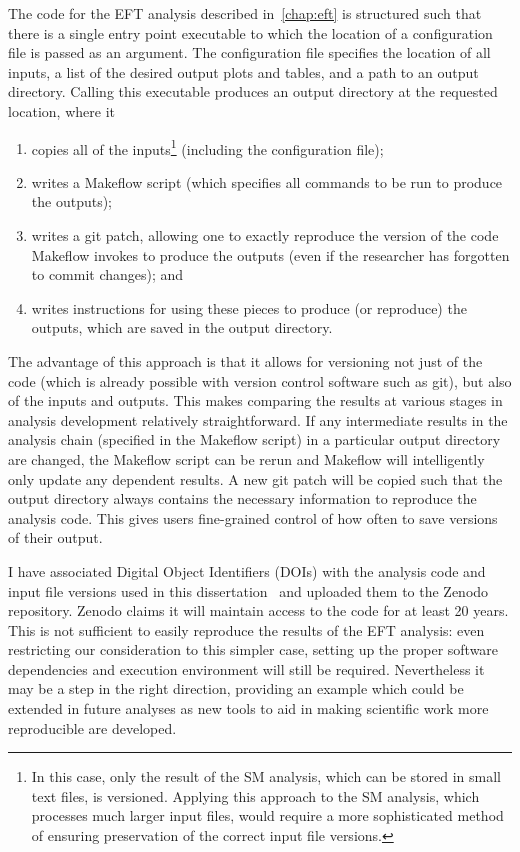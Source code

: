 The code for the EFT analysis described in~\cref{chap:eft} is structured such
that there is a single entry point executable to which the location of a
configuration file is passed as an argument. The configuration file specifies
the location of all inputs, a list of the desired output plots and tables, and a
path to an output directory. Calling this executable produces an output
directory at the requested location, where it
\begin{enumerate}
  \item copies all of the inputs\footnote{In this case, only the result of the SM analysis, which can be stored in small text files, is versioned. Applying this approach to the SM analysis, which processes much larger input files, would require a more sophisticated method of ensuring preservation of the correct input file versions.} (including the configuration file);
  \item writes a Makeflow script (which specifies all commands to be run to produce the outputs);
  \item writes a git patch, allowing one to exactly reproduce the version of the code Makeflow invokes to produce the outputs (even if the researcher has forgotten to commit changes); and
  \item writes instructions for using these pieces to produce (or reproduce) the outputs, which are saved in the output directory.
\end{enumerate}

The advantage of this approach is that it allows for versioning not just of the
code (which is already possible with version control software such as git), but
also of the inputs and outputs. This makes comparing the results at various
stages in analysis development relatively straightforward. If any intermediate
results in the analysis chain (specified in the Makeflow script) in a particular
output directory are changed, the Makeflow script can be rerun and Makeflow will
intelligently only update any dependent results. A new git patch will be copied
such that the output directory always contains the necessary information to
reproduce the analysis code. This gives users fine-grained control of how often
to save versions of their output.

I have associated Digital Object Identifiers (DOIs) with the analysis code and
input file versions used in this dissertation~\cite{anna_woodard_2018_1197392,
anna_woodard_2018_1197390} and uploaded them to the Zenodo repository. Zenodo
claims it will maintain access to the code for at least 20 years. This is not
sufficient to easily reproduce the results of the EFT analysis: even restricting
our consideration to this simpler case, setting up the proper software
dependencies and execution environment will still be required. Nevertheless it
may be a step in the right direction, providing an example which could be
extended in future analyses as new tools to aid in making scientific work more
reproducible are developed.
